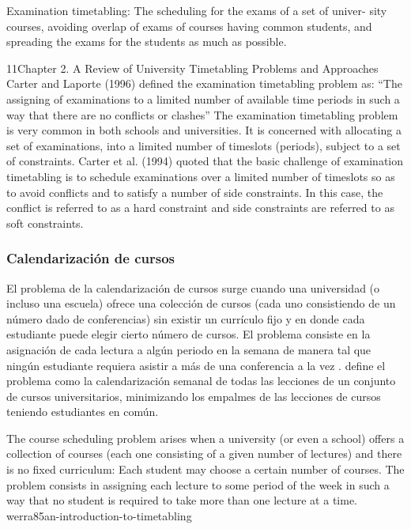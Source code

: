 \documentclass[draft,12pt,headsepline,footsepline,paper=letter]{scrreprt}
\begin{document}
Examination timetabling: The scheduling for the exams of a set of univer- sity courses, avoiding overlap of exams of courses having common students, and spreading the exams for the students as much as possible.

11Chapter 2. A Review of University Timetabling Problems and Approaches
Carter and Laporte (1996) defined the examination timetabling problem as:
“The assigning of examinations to a limited number of available time periods in such a way that there are no conflicts or clashes”
The examination timetabling problem is very common in both schools and universities. It is concerned with allocating a set of examinations, into a limited number of timeslots (periods), subject to a set of constraints. Carter et al. (1994) quoted that the basic challenge of examination timetabling is to schedule examinations over a limited number of timeslots so as to avoid conflicts and to satisfy a number of side constraints. In this case, the conflict is referred to as a hard constraint and side constraints are referred to as soft constraints.
\fi

\subsubsection{Calendarización de cursos}

El problema de la calendarización de cursos surge cuando una universidad (o incluso una escuela) ofrece una colección de cursos (cada uno consistiendo de un número dado de conferencias) sin existir un currículo fijo y en donde cada estudiante puede elegir cierto número de cursos. El problema consiste en la asignación de cada lectura a algún periodo en la semana de manera tal que ningún estudiante requiera asistir a más de una conferencia a la vez \citep[p.~157]{werra85an-introduction-to-timetabling}. 
\citet[p.~88]{schaerf99a-survey-of-automated} define el problema como la calendarización semanal de todas las lecciones de un conjunto de cursos universitarios, minimizando los empalmes de las lecciones de cursos teniendo estudiantes en común.

\iffalse
The course scheduling problem arises when a university (or even a school) offers a collection of courses (each one consisting of a given number of lectures) and there is no fixed curriculum: Each student may choose a certain number of courses. The problem consists in assigning each lecture to some period of the week in such a way that no student is required to take more than one lecture at a time. {werra85an-introduction-to-timetabling}
\end{document}
